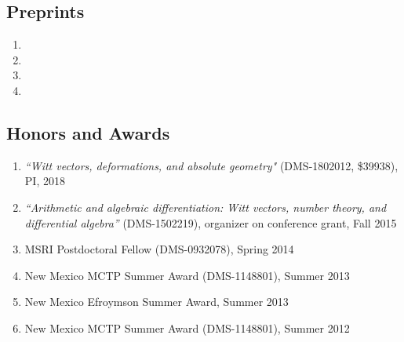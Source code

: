 \documentclass[a4paper,10pt]{article}
\begin{document}
\subsection*{Preprints}
\begin{enumerate}
	\item {}
	\item {} 
	\item  {} 
	\item  {}
\end{enumerate}



\subsection*{Honors and Awards}
\begin{enumerate} \addtolength{\itemsep}{-0.5\baselineskip}
\item \emph{``Witt vectors, deformations, and absolute geometry"} (DMS-1802012, \$39938), PI, 2018
\item \emph{``Arithmetic and algebraic differentiation: Witt vectors, number theory, and differential algebra''} (DMS-1502219), organizer on conference grant, Fall 2015  
 \item MSRI Postdoctoral Fellow (DMS-0932078), Spring 2014
\item New Mexico MCTP Summer Award (DMS-1148801), Summer 2013 
\item New Mexico Efroymson Summer Award, Summer 2013 
 \item New Mexico MCTP Summer Award (DMS-1148801), Summer 2012 
\end{enumerate}
\end{document}

